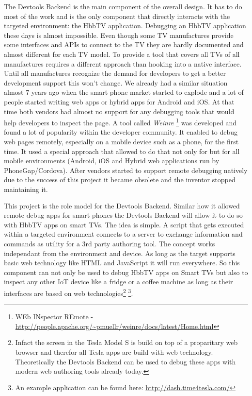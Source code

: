 The Devtools Backend is the main component of the overall design. It has to do most of the work and
is the only component that directly interacts with the targeted environment: the HbbTV application.
Debugging an HbbTV application these days is almost impossible. Even though some TV manufactures
provide some interfaces and APIs to connect to the TV they are hardly documented and almost different
for each TV model. To provide a tool that covers all TVs of all manufactures requires a different
approach than hooking into a native interface. Until all manufactures recognize the demand for
developers to get a better development support this won't change. We already had a similar situation
almost 7 years ago when the smart phone market started to explode and a lot of people started writing
web apps or hybrid apps for Android and iOS. At that time both vendors had almost no support for
any debugging tools that would help developers to inspect the page. A tool called \textit{Weinre}
\footnote{WEb INspector REmote - \url{http://people.apache.org/~pmuellr/weinre/docs/latest/Home.html}}
was developed and found a lot of popularity within the developer community. It enabled to debug web
pages remotely, especially on a mobile device such as a phone, for the first time. It used a special
approach that allowed to do that not only for but for all mobile environments (Android, iOS and
Hybrid web applications run by PhoneGap/Cordova). After vendors started to support remote debugging
natively due to the success of this project it became obsolete and the inventor stopped maintaining
it.

This project is the role model for the Devtools Backend. Similar how it allowed remote debug apps
for smart phones the Devtools Backend will allow it to do so with HbbTV apps on smart TVs. The idea
is simple. A script that gets executed within a targeted environment connects to a server to
exchange information and commands as utility for a 3rd party authoring tool. The concept works
independant from the environment and device. As long as the target supports basic web technology
like HTML and JavaScript it will run everywhere. So this component can not only be used to debug HbbTV
apps on Smart TVs but also to inspect any other IoT device like a fridge or a coffee machine as long
as their interfaces are based on web technologies\footnote{Infact the screen in the Tesla Model S
is build on top of a proparitary web browser and therefor all Tesla apps are build with web
technology. Theoretically the Devtools Backend can be used to debug these apps with modern web
authoring tools already today.} \footnote{An example application can be found here: \url{http://dash.time4tesla.com/}}.

